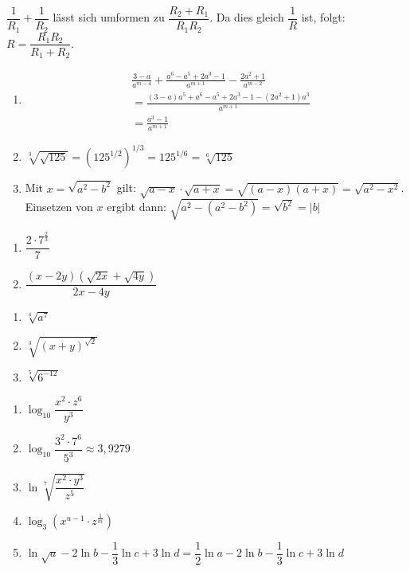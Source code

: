 $\dfrac{1}{R_1} + \dfrac{1}{R_2}$ lässt sich umformen zu $\dfrac{R_2 + R_1}{R_1 R_2}$. Da dies gleich $\dfrac{1}{R}$ ist, folgt: $R = \dfrac{R_1 R_2}{R_1 + R_2}$.

\begin{enumerate}[label=\alph*)]
  \item \begin{align*}
      &\frac{3-a}{a^{m-4}} + \frac{a^6 - a^5 + 2a^3 - 1}{a^{m+1}} - \frac{2a^2+1}{a^{m-2}}\\
      &= \frac{(3-a)a^5 + a^6 - a^5 + 2a^3 - 1 - (2a^2+1)a^3}{a^{m+1}}\\
      &= \frac{a^3 - 1}{a^{m+1}}
    \end{align*}
  \item $\sqrt[3]{\sqrt{125}} = \left(125^{1/2}\right)^{1/3} = 125^{1/6} = \sqrt[6]{125}$
  \item Mit $x = \sqrt{a^2 - b^2}$ gilt: $\sqrt{a-x} \cdot \sqrt{a+x} = \sqrt{(a-x)(a+x)} = \sqrt{a^2 - x^2}$. Einsetzen von $x$ ergibt dann: $\sqrt{a^2 - \left(a^2 - b^2\right)} = \sqrt{b^2} = |b|$
\end{enumerate}

\begin{enumerate}[label=\alph*)]
  \item $\dfrac{2 \cdot 7^{\frac{2}{3}}}{7}$
  \item $\dfrac{(x-2y)(\sqrt{2x} + \sqrt{4y})}{2x - 4y}$
\end{enumerate}

\begin{enumerate}[label=\alph*)]
  \item $\sqrt[4]{a^7}$
  \item $\sqrt[3]{(x+y)^{\sqrt{2}}}$
  \item $\sqrt[5]{6^{-12}}$
\end{enumerate}

\begin{enumerate}[label=\alph*)]
  \item $\log_{10} \dfrac{x^2 \cdot z^6}{y^3}$
  \item $\log_{10} \dfrac{3^2 \cdot 7^6}{5^3} \approx 3{,}9279$
  \item $\ln \sqrt[7]{\dfrac{x^2 \cdot y^3}{z^5}}$
  \item $\log_3 \left(x^{u-1} \cdot z^{\frac{1}{m}}\right)$
  \item $\ln\sqrt{a} - 2\ln b - \dfrac{1}{3}\ln c + 3\ln d = \dfrac{1}{2}\ln a - 2\ln b - \dfrac{1}{3}\ln c + 3\ln d$
\end{enumerate}

